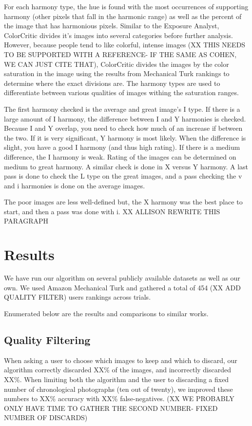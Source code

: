\documentclass[twocolumn]{article}
\begin{document}
For each harmony type, the hue is found with the most occurrences of supporting harmony (other pixels that fall in the harmonic range) as well as the percent of the image that has harmonious pixels. Similar to the Exposure Analyst, ColorCritic divides it's images into several categories before further analysis. However, because people tend to like colorful, intense images (XX THIS NEEDS TO BE SUPPORTED WITH A REFERENCE- IF THE SAME AS COHEN, WE CAN JUST CITE THAT), ColorCritic divides the images by the color saturation in the image using the results from Mechanical Turk rankings to determine where the exact divisions are. The harmony types are used to differentiate between various qualities of images withing the saturation ranges.

The first harmony checked is the average and great image's I type. If there is a large amount of I harmony, the difference between I and Y harmonies is checked. Because I and Y overlap, you need to check how much of an increase if between the two. If it is very significant, Y harmony is most likely. When the difference is slight, you have a good I harmony (and thus high rating). If there is a medium difference, the I harmony is weak. Rating of the images can be determined on medium to great harmony. A similar check is done in X versus Y harmony. A last pass is done to check the L type on the great images, and a pass checking the v and i harmonies is done on the average images.

The poor images are less well-defined but, the X harmony was the best place to start, and then a pass was done with i. XX ALLISON REWRITE THIS PARAGRAPH

\section{Results}
We have run our algorithm on several publicly available datasets as well as our own. We used Amazon Mechanical Turk and gathered a total of 454 (XX  ADD QUALITY FILTER) users rankings across trials.

Enumerated below are the results and comparisons to similar works.

\subsection{Quality Filtering} When asking a user to choose which images to keep and which to discard, our algorithm correctly discarded XX\% of the images, and incorrectly discarded XX\%. When limiting both the algorithm and the user to discarding a fixed number of chronological photographs (ten out of twenty), we improved these numbers to XX\% accuracy with XX\% false-negatives. (XX WE PROBABLY ONLY HAVE TIME TO GATHER THE SECOND NUMBER- FIXED NUMBER OF DISCARDS)
\end{document}
